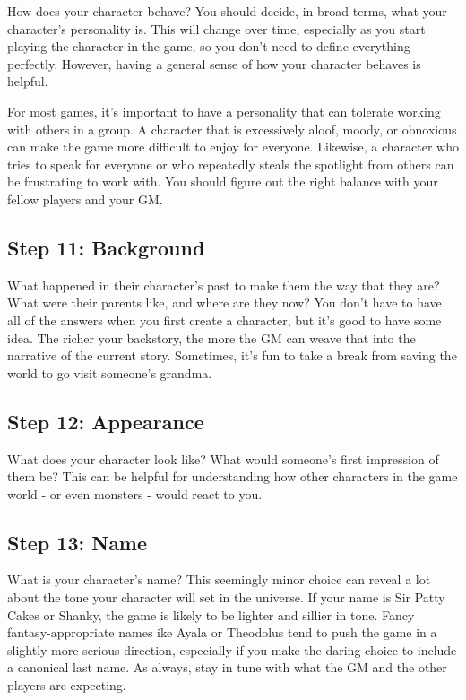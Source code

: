         How does your character behave?
        You should decide, in broad terms, what your character's personality is.
        This will change over time, especially as you start playing the character in the game, so you don't need to define everything perfectly.
        However, having a general sense of how your character behaves is helpful.

        For most games, it's important to have a personality that can tolerate working with others in a group.
        A character that is excessively aloof, moody, or obnoxious can make the game more difficult to enjoy for everyone.
        Likewise, a character who tries to speak for everyone or who repeatedly steals the spotlight from others can be frustrating to work with.
        You should figure out the right balance with your fellow players and your GM.\@

    \subsection{Step 11: Background}
        What happened in their character's past to make them the way that they are?
        What were their parents like, and where are they now?
        You don't have to have all of the answers when you first create a character, but it's good to have some idea.
        The richer your backstory, the more the GM can weave that into the narrative of the current story.
        Sometimes, it's fun to take a break from saving the world to go visit someone's grandma.

    \subsection{Step 12: Appearance}
        What does your character look like?
        What would someone's first impression of them be?
        This can be helpful for understanding how other characters in the game world - or even monsters - would react to you.

    \subsection{Step 13: Name}
        What is your character's name?
        This seemingly minor choice can reveal a lot about the tone your character will set in the universe.
        If your name is Sir Patty Cakes or Shanky, the game is likely to be lighter and sillier in tone.
        Fancy fantasy-appropriate names ike Ayala or Theodolus tend to push the game in a slightly more serious direction, especially if you make the daring choice to include a canonical last name.
        As always, stay in tune with what the GM and the other players are expecting.

